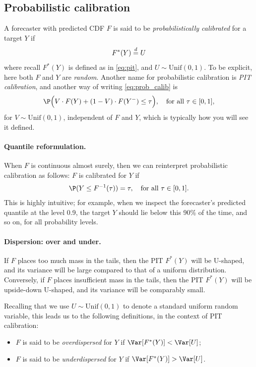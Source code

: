 \documentclass{article}
\begin{document}
\subsection{Probabilistic calibration}

A forecaster with predicted CDF $F$ is said to be \emph{probabilistically 
  calibrated} for a target $Y$ if 
\begin{equation}
\label{eq:prob_calib}
F^*(Y) \overset{d}{=} U
\end{equation}
where recall $F^*(Y)$ is defined as in \eqref{eq:pit}, and $U \sim 
\mathrm{Unif}(0,1)$. To be explicit, here both $F$ and $Y$ are
\emph{random}. Another name for probabilistic calibration is \emph{PIT
  calibration}, and another way of writing \eqref{eq:prob_calib} is  
\[
\P\Big( V \cdot F(Y) + (1-V) \cdot F(Y^-) \leq \tau \Big), \quad \text{for all
  $\tau \in [0,1]$}, 
\]
for $V \sim \mathrm{Unif}(0,1)$, independent of $F$ and $Y$, which is typically
how you will see it defined. 

\paragraph{Quantile reformulation.}

When $F$ is continuous almost surely, then we can reinterpret probabilistic
calibration as follows: $F$ is calibrated for $Y$ if   
\[
\P(Y \leq F^{-1}(\tau)) = \tau, \quad \text{for all $\tau \in [0,1]$}.  
\]
This is highly intuitive; for example, when we inspect the forecaster's
predicted quantile at the level 0.9, the target $Y$ should lie below this 90\% 
of the time, and so on, for all probability levels.   

\paragraph{Dispersion: over and under.}

If $F$ places too much mass in the tails, then the PIT $F^*(Y)$ will be
U-shaped, and its variance will be large compared to that of a uniform
distribution. Conversely, if $F$ places insufficient mass in the tails, then the 
PIT $F^*(Y)$ will be upside-down U-shaped, and its variance will be comparably
small. 

Recalling that we use $U \sim \mathrm{Unif}(0,1)$ to denote a standard uniform
random variable, this leads us to the following definitions, in the context of
PIT calibration:    

\begin{itemize}
\item $F$ is said to be \emph{overdispersed} for $Y$ if $\Var[F^*(Y)] < \Var[U]$;
\item $F$ is said to be \emph{underdispersed} for $Y$ if $\Var[F^*(Y)] >
  \Var[U]$. 
\end{itemize}
\end{document}
